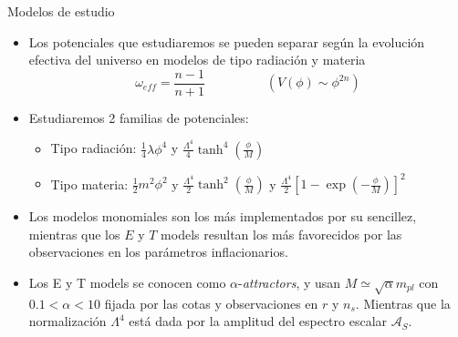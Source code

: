 \documentclass{beamer}
\begin{document}
            \begin{frame}{Modelos de estudio}
                \begin{itemize}
                    \item[\textcolor{brown}{$\bullet$}] Los potenciales que estudiaremos se pueden separar según la evolución efectiva del universo en modelos de tipo radiación y materia
                        \begin{equation*}
                            \omega_{eff} = \frac{n - 1}{n + 1} \hspace{2cm} \left( V(\phi) \sim \phi^{2n} \right)
                        \end{equation*}
                    \item[\textcolor{brown}{$\bullet$}] Estudiaremos 2 familias de potenciales:
                        \begin{itemize}
                            \item[\textcolor{cyan}{$\bullet$}] Tipo radiación: $\frac{1}{4} \lambda \phi^4$ y $\frac{\Lambda^4}{4} \tanh^4 \left( \frac{\phi}{M} \right)$
                            \item[\textcolor{cyan}{$\bullet$}] Tipo materia: $\frac{1}{2} m^2 \phi^2$ y $\frac{\Lambda^4}{2} \tanh^2 \left( \frac{\phi}{M} \right)$ y $\frac{\Lambda^4}{2} \left[ 1 - \exp \left( - \frac{\phi}{M} \right) \right]^2$
                        \end{itemize}
                    \item[\textcolor{brown}{$\bullet$}] Los modelos monomiales son los más implementados por su sencillez, mientras que los $E$ y $T$ models resultan los más favorecidos por las observaciones en los parámetros inflacionarios.
                    \item[\textcolor{brown}{$\bullet$}] Los E y T models se conocen como $\alpha$-\textit{attractors}, y usan $M \simeq \sqrt{\alpha} m_{pl}$ con $0.1 < \alpha < 10$ fijada por las cotas y observaciones en $r$ y $n_s$. Mientras que la normalización $\Lambda^4$ está dada por la amplitud del espectro escalar $\mathcal{A}_S$.
                \end{itemize}
            \end{frame}
\end{document}
